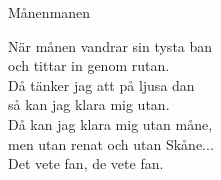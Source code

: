 \begin{song}{Månen}{manen}
\begin{vers}
När månen vandrar sin tysta ban\\
och tittar in genom rutan.\\
Då tänker jag att på ljusa dan\\
så kan jag klara mig utan.\\
Då kan jag klara mig utan måne,\\
men utan renat och utan Skåne...\\
Det vete fan, de vete fan.\\
\end{vers}
\end{song}
